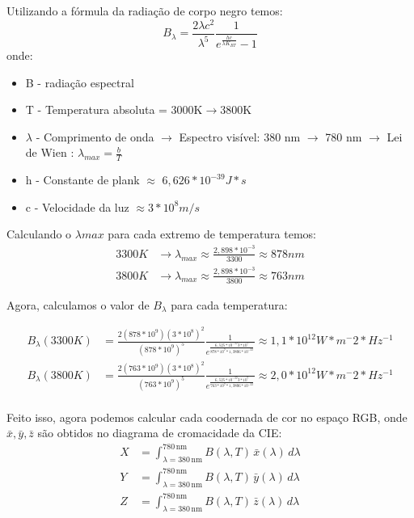 \documentclass{article}
\begin{document}
 Utilizando a fórmula da radiação de corpo negro temos: 
\begin{equation}
  B_\lambda=\frac{2\lambda c^2}{\lambda^5}\frac{1}{e^{\frac{hc}{\lambda K_{BT}}}-1}
  \label{eq:}
\end{equation}
onde:
\begin{itemize}
  \item B - radiação espectral
  \item T - Temperatura absoluta = 3000K\(\rightarrow\)3800K
  \item \(\lambda\) - Comprimento de onda \(\rightarrow\) Espectro visível: 380 nm \(\rightarrow\) 780 nm \(\rightarrow\) Lei de Wien : \(\lambda_{max}=\frac{b}{T}\)
  \item h - Constante de plank \(\approx\) \(6,626*10^{-39} J*s\)  
  \item c - Velocidade da luz \(\approx 3*10^8 m/s\)
\end{itemize}

Calculando o \(\lambda{max}\) para cada extremo de temperatura temos:
\begin{align*}
  3300 K& \rightarrow \lambda_{max} \approx \frac{2,898*10^{-3}}{3300} \approx 878nm\\
  3800 K& \rightarrow \lambda_{max} \approx \frac{2,898*10^{-3}}{3800} \approx 763nm
\end{align*}


Agora, calculamos o valor de \(B_\lambda\) para cada temperatura:

\begin{align*}
  B_{\lambda}(3300K)&=\frac{2 (878*10^9)(3*10^8)^2}{(878*10^9)^5}\frac{1}{e^{\frac{6,525*10^{-39}3*10^7}{878*10^9 * 1,3806*10^{-23}}}} \approx 1,1*10^{12} W*m^-2*Hz^{-1}\\
  B_{\lambda}(3800K)&=\frac{2 (763*10^9)(3*10^8)^2}{(763*10^9)^5}\frac{1}{e^{\frac{6,525*10^{-39}3*10^7}{763*10^9 * 1,3806*10^{-23}}}} \approx 2,0*10^{12} W*m^-2*Hz^{-1}\\
\end{align*}

Feito isso, agora podemos calcular cada coodernada de cor no espaço RGB, onde \(\bar{x},\bar{y},\bar{z}\) são obtidos no diagrama de cromacidade da CIE\cite{Paschotta}:
\begin{align*}
X &= \int_{\lambda=380\,\text{nm}}^{780\,\text{nm}} B(\lambda, T)\,\bar{x}(\lambda)\,d\lambda \\[6pt]
Y &= \int_{\lambda=380\,\text{nm}}^{780\,\text{nm}} B(\lambda, T)\,\bar{y}(\lambda)\,d\lambda \\[6pt]
Z &= \int_{\lambda=380\,\text{nm}}^{780\,\text{nm}} B(\lambda, T)\,\bar{z}(\lambda)\,d\lambda
\end{align*}
\end{document}
